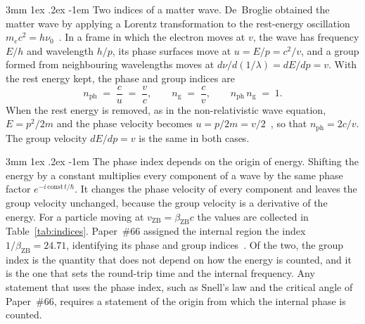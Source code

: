 \documentclass[%
 reprint, amsmath,amssymb, aps, prb, ]{revtex4-2}
\makeatletter
\numberwithin{equation}{section}
\renewcommand\paragraph{%
  \@startsection{paragraph}{4}{\z@}%
    {3mm \@plus 1ex \@minus .2ex}%
    {-1em}%
    {\normalfont\normalsize\itshape}}
\newcommand{\bZB}{\beta_{\mathrm{ZB}}}
\newcommand{\nph}{n_{\mathrm{ph}}}
\newcommand{\ngr}{n_{\mathrm{g}}}
\makeatother
\begin{document}
\paragraph{Two indices of a matter wave.} De~Broglie obtained the matter wave by applying a Lorentz transformation to the rest-energy oscillation $m_ec^2 = h\nu_0$~\cite{deBroglie1925, Yukawa1954}. In a frame in which the electron moves at $v$, the wave has frequency $E/h$ and wavelength $h/p$, its phase surfaces move at $u = E/p = c^2/v$, and a group formed from neighbouring wavelengths moves at $d\nu/d(1/\lambda) = dE/dp = v$. With the rest energy kept, the phase and group indices are
\begin{equation}
\nph \;=\; \frac{c}{u} \;=\; \frac{v}{c},
\qquad
\ngr \;=\; \frac{c}{v},
\qquad
\nph\,\ngr \;=\; 1.
\label{eq:indices_rel}
\end{equation}
When the rest energy is removed, as in the non-relativistic wave equation, $E = p^2/2m$ and the phase velocity becomes $u = p/2m = v/2$~\cite{Yukawa1954}, so that $\nph = 2c/v$. The group velocity $dE/dp = v$ is the same in both cases.

\paragraph{The phase index depends on the origin of energy.} Shifting the energy by a constant multiplies every component of a wave by the same phase factor $e^{-i\,\mathrm{const}\,t/\hbar}$. It changes the phase velocity of every component and leaves the group velocity unchanged, because the group velocity is a derivative of the energy. For a particle moving at $v_{\mathrm{ZB}} = \bZB c$ the values are collected in Table~\ref{tab:indices}. Paper~\#66 assigned the internal region the index $1/\bZB = 24.71$, identifying its phase and group indices~\cite{H66}. Of the two, the group index is the quantity that does not depend on how the energy is counted, and it is the one that sets the round-trip time and the internal frequency. Any statement that uses the phase index, such as Snell's law and the critical angle of Paper~\#66, requires a statement of the origin from which the internal phase is counted.
\end{document}

